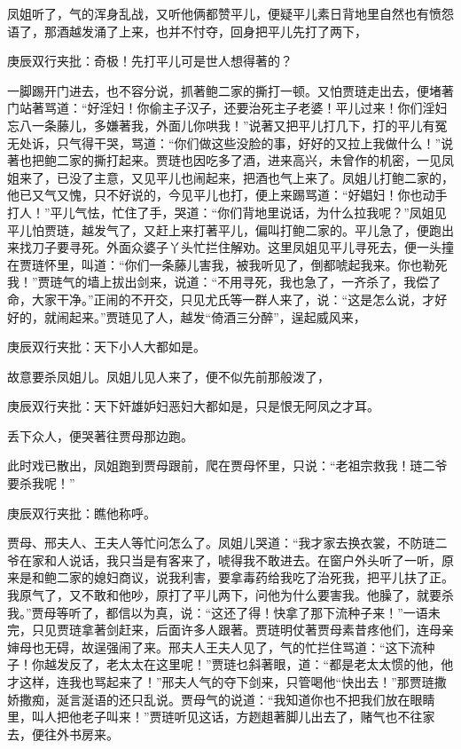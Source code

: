 \begin{parag}


    凤姐听了，气的浑身乱战，又听他俩都赞平儿，便疑平儿素日背地里自然也有愤怨语了，那酒越发涌了上来，也并不忖夺，回身把平儿先打了两下，\begin{note}庚辰双行夹批：奇极！先打平儿可是世人想得著的？\end{note}一脚踢开门进去，也不容分说，抓著鲍二家的撕打一顿。又怕贾琏走出去，便堵著门站著骂道：“好淫妇！你偷主子汉子，还要治死主子老婆！平儿过来！你们淫妇忘八一条藤儿，多嫌著我，外面儿你哄我！”说著又把平儿打几下，打的平儿有冤无处诉，只气得干哭，骂道：“你们做这些没脸的事，好好的又拉上我做什么！”说著也把鲍二家的撕打起来。贾琏也因吃多了酒，进来高兴，未曾作的机密，一见凤姐来了，已没了主意，又见平儿也闹起来，把酒也气上来了。凤姐儿打鲍二家的，他已又气又愧，只不好说的，今见平儿也打，便上来踢骂道：“好娼妇！你也动手打人！”平儿气怯，忙住了手，哭道：“你们背地里说话，为什么拉我呢？”凤姐见平儿怕贾琏，越发气了，又赶上来打著平儿，偏叫打鲍二家的。平儿急了，便跑出来找刀子要寻死。外面众婆子丫头忙拦住解劝。这里凤姐见平儿寻死去，便一头撞在贾琏怀里，叫道：“你们一条藤儿害我，被我听见了，倒都唬起我来。你也勒死我！”贾琏气的墙上拔出剑来，说道：“不用寻死，我也急了，一齐杀了，我偿了命，大家干净。”正闹的不开交，只见尤氏等一群人来了，说：“这是怎么说，才好好的，就闹起来。”贾琏见了人，越发“倚酒三分醉”，逞起威风来，\begin{note}庚辰双行夹批：天下小人大都如是。\end{note}故意要杀凤姐儿。凤姐儿见人来了，便不似先前那般泼了，\begin{note}庚辰双行夹批：天下奸雄妒妇恶妇大都如是，只是恨无阿凤之才耳。\end{note}丢下众人，便哭著往贾母那边跑。
\end{parag}


\begin{parag}


    此时戏已散出，凤姐跑到贾母跟前，爬在贾母怀里，只说：“老祖宗救我！琏二爷要杀我呢！”\begin{note}庚辰双行夹批：瞧他称呼。\end{note}贾母、邢夫人、王夫人等忙问怎么了。凤姐儿哭道：“我才家去换衣裳，不防琏二爷在家和人说话，我只当是有客来了，唬得我不敢进去。在窗户外头听了一听，原来是和鲍二家的媳妇商议，说我利害，要拿毒药给我吃了治死我，把平儿扶了正。我原气了，又不敢和他吵，原打了平儿两下，问他为什么要害我。他臊了，就要杀我。”贾母等听了，都信以为真，说：“这还了得！快拿了那下流种子来！”一语未完，只见贾琏拿著剑赶来，后面许多人跟著。贾琏明仗著贾母素昔疼他们，连母亲婶母也无碍，故逞强闹了来。邢夫人王夫人见了，气的忙拦住骂道：“这下流种子！你越发反了，老太太在这里呢！”贾琏乜斜著眼，道：“都是老太太惯的他，他才这样，连我也骂起来了！”邢夫人气的夺下剑来，只管喝他“快出去！”那贾琏撒娇撒痴，涎言涎语的还只乱说。贾母气的说道：“我知道你也不把我们放在眼睛里，叫人把他老子叫来！”贾琏听见这话，方趔趄著脚儿出去了，赌气也不往家去，便往外书房来。
\end{parag}


